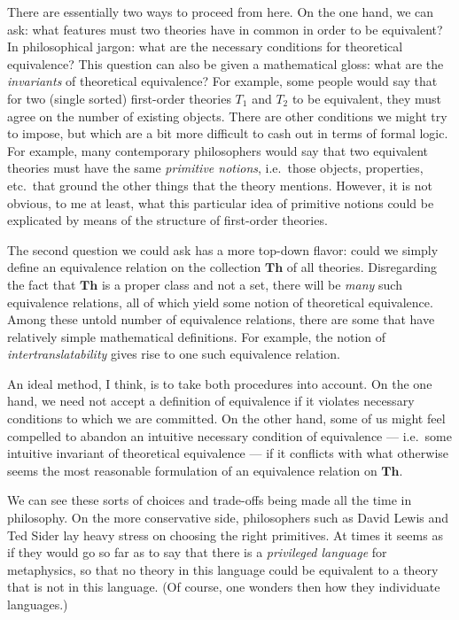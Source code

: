 There are essentially two ways to proceed from here.  On the one hand,
we can ask: what features must two theories have in common in order to
be equivalent?  In philosophical jargon: what are the necessary
conditions for theoretical equivalence?  This question can also be
given a mathematical gloss: what are the {\it invariants} of
theoretical equivalence?  For example, some people would say that for
two (single sorted) first-order theories $T_1$ and $T_2$ to be
equivalent, they must agree on the number of existing objects.  There
are other conditions we might try to impose, but which are a bit more
difficult to cash out in terms of formal logic.  For example, many
contemporary philosophers would say that two equivalent theories must
have the same {\it primitive notions}, i.e.\ those objects,
properties, etc.\ that ground the other things that the theory
mentions.  However, it is not obvious, to me at least, what this
particular idea of primitive notions could be explicated by means of
the structure of first-order theories.

The second question we could ask has a more top-down flavor: could we
simply define an equivalence relation on the collection $\mathbf{Th}$
of all theories.  Disregarding the fact that $\mathbf{Th}$ is a proper
class and not a set, there will be {\it many} such equivalence
relations, all of which yield some notion of theoretical equivalence.
Among these untold number of equivalence relations, there are some
that have relatively simple mathematical definitions.  For example,
the notion of {\it intertranslatability} gives rise to one such
equivalence relation.

An ideal method, I think, is to take both procedures into account.  On
the one hand, we need not accept a definition of equivalence if it
violates necessary conditions to which we are committed.  On the other
hand, some of us might feel compelled to abandon an intuitive
necessary condition of equivalence --- i.e.\ some intuitive invariant
of theoretical equivalence --- if it conflicts with what otherwise
seems the most reasonable formulation of an equivalence relation on
$\mathbf{Th}$.

We can see these sorts of choices and trade-offs being made all the
time in philosophy.  On the more conservative side, philosophers such
as David Lewis and Ted Sider lay heavy stress on choosing the right
primitives.  At times it seems as if they would go so far as to say
that there is a {\it privileged language} for metaphysics, so that no
theory in this language could be equivalent to a theory that is not in
this language.  (Of course, one wonders then how they individuate
languages.)

